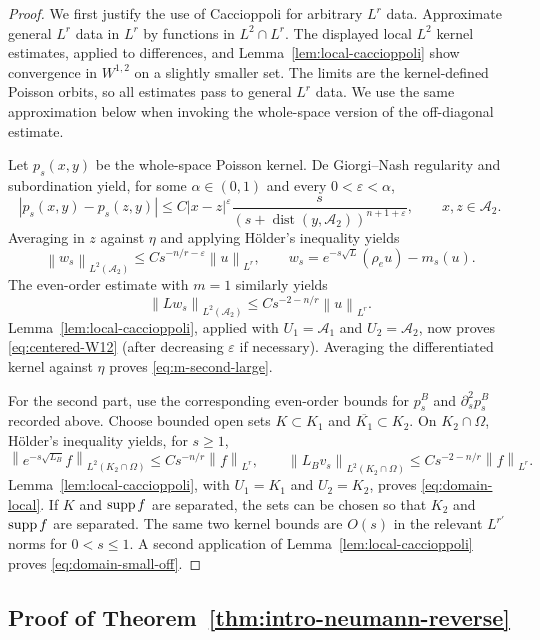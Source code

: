 \documentclass[12pt]{amsart}
\newcommand{\supp}{{\rm supp}{\hspace{.05cm}}}
\newcommand{\dist}{\operatorname{dist}}
\newcommand{\cA}{\mathcal A}
\newcommand{\norm}[2]{\left\lVert #1\right\rVert_{#2}}
\newcommand{\abs}[1]{\left\lvert #1\right\rvert}
\theoremstyle{remark}
\begin{document}
\begin{proof}
We first justify the use of Caccioppoli for arbitrary \(L^r\) data.
Approximate general \(L^r\) data in \(L^r\) by functions in $L^2\cap L^r$.
The displayed local \(L^2\)
kernel estimates, applied to differences, and
Lemma~\ref{lem:local-caccioppoli} show convergence in \(W^{1,2}\) on a
slightly smaller set.  The limits are the kernel-defined Poisson orbits,
so all estimates pass to general \(L^r\) data.  We use the same
approximation below when invoking the whole-space version of the
off-diagonal estimate.

Let $p_s(x,y)$ be the whole-space Poisson kernel.  De Giorgi--Nash
regularity and subordination yield, for some $\alpha\in(0,1)$ and every
$0<\varepsilon<\alpha$,
\[
 \abs{p_s(x,y)-p_s(z,y)}
 \leq C\abs{x-z}^{\varepsilon}
 \frac{s}{(s+\dist(y,\cA_2))^{n+1+\varepsilon}},
 \qquad x,z\in\cA_2.
\]
Averaging in $z$ against $\eta$ and applying H\"older's inequality yields
\[
 \norm{w_s}{L^2(\cA_2)}
 \leq Cs^{-n/r-\varepsilon}\norm u{L^r},
 \qquad
 w_s=e^{-s\sqrt L}(\rho_eu)-m_s(u).
\]
The even-order estimate with $m=1$ similarly yields
\[
 \norm{Lw_s}{L^2(\cA_2)}
 \leq Cs^{-2-n/r}\norm u{L^r}.
\]
Lemma~\ref{lem:local-caccioppoli}, applied with
$U_1=\cA_1$ and $U_2=\cA_2$, now proves \eqref{eq:centered-W12} (after decreasing
$\varepsilon$ if necessary).  Averaging the differentiated kernel against
$\eta$ proves \eqref{eq:m-second-large}.

For the second part, use the corresponding even-order bounds for
$p_s^B$ and $\partial_s^2p_s^B$ recorded above.  Choose bounded open sets
$K\subset K_1$ and $\overline{K_1}\subset K_2$.  On $K_2\cap\Omega$, H\"older's inequality
yields, for $s\geq1$,
\[
 \norm{e^{-s\sqrt{L_B}}f}{L^2(K_2\cap\Omega)}\leq Cs^{-n/r}\norm f{L^r},
 \qquad
 \norm{L_Bv_s}{L^2(K_2\cap\Omega)}\leq Cs^{-2-n/r}\norm f{L^r}.
\]
Lemma~\ref{lem:local-caccioppoli}, with $U_1=K_1$ and $U_2=K_2$, proves
\eqref{eq:domain-local}.  If $K$ and $\supp f$ are separated, the sets can
be chosen so that $K_2$ and $\supp f$ are separated.  The same two kernel bounds are
$O(s)$ in the relevant $L^{r'}$ norms for $0<s\leq1$.  A second
application of Lemma~\ref{lem:local-caccioppoli} proves
\eqref{eq:domain-small-off}.
\end{proof}

\subsection{Proof of Theorem~\ref{thm:intro-neumann-reverse}}
\end{document}
